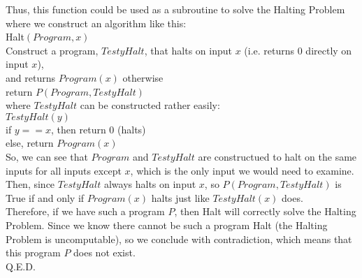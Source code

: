\documentclass{article}
\begin{document}
Thus, this function could be used as a subroutine to solve the Halting Problem where we construct an algorithm like this: \\[.2cm]
\indent Halt$(Program, x)$ \\[.1cm]
\indent\indent Construct a program, $TestyHalt$, that halts on input $x$ (i.e. returns 0 directly on input $x$), \\
\indent\indent\indent and returns $Program(x)$ otherwise \\[.1cm]
\indent\indent return $P(Program, TestyHalt)$ \\[.3cm]
where $TestyHalt$ can be constructed rather easily: \\[.1cm]
\indent $TestyHalt(y)$ \\[.1cm]
\indent\indent if $y == x$, then return 0 (halts) \\
\indent\indent else, return $Program(x)$ \\

So, we can see that $Program$ and $TestyHalt$ are constructued to halt on the same inputs for all inputs except $x$, which is the only input we would need to examine. Then, since $TestyHalt$ always halts on input $x$, so $P(Program, TestyHalt)$ is True if and only if $Program(x)$ halts just like $TestyHalt(x)$ does. \\

Therefore, if we have such a program $P$, then Halt will correctly solve the Halting Problem. Since we know there cannot be such a program Halt (the Halting Problem is uncomputable), so we conclude with contradiction, which means that this program $P$ does not exist. \\

Q.E.D.
\end{document}
